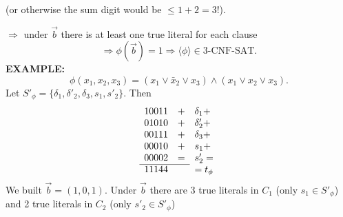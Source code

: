 (or otherwise the sum digit would be $\leq1+2=3$!).

$\Rightarrow$ under $\vec b$ there is at least one true literal for each clause
\[\Rightarrow\phi(\vec b)=1\Rightarrow\langle\phi\rangle\in\mathrm{3\text{-}CNF\text{-}SAT}.\]
\textbf{EXAMPLE:}
\[\phi(x_1,x_2,x_3)=(x_1\lor\bar x_2\lor x_3)\land(x_1\lor x_2\lor x_3).\]
Let $S'_\phi=\{\delta_1,\delta'_2,\delta_3,s_1,s'_2\}$. Then
\[
\begin{array}{rrl}
10011&+&\delta_1+\\
01010&+&\delta'_2+\\
00111&+&\delta_3+\\
00010&+&s_1+\\
00002&=&s'_2=\\\cline{1-2}
11144&&=t_\phi
\end{array}
\]
We built $\vec b=(1,0,1)$. Under $\vec b$ there are 3 true literals in $C_1$ (only $s_1\in S'_\phi$) and 2 true literals in $C_2$ (only $s'_2\in S'_\phi$)
